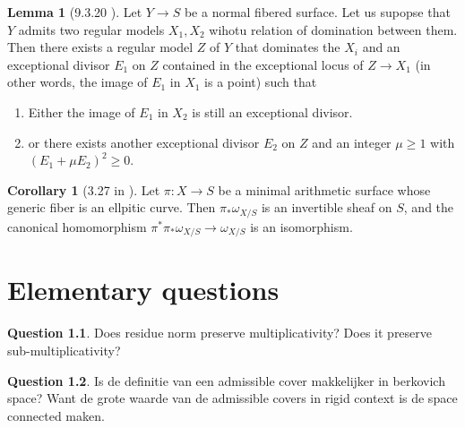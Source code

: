 \documentclass[a4paper]{report}
\theoremstyle{definition}
\newtheorem*{lemma}{Lemma}
\newtheorem*{corollary}{Corollary}
\newtheorem{question}{Question}
\begin{document}
\begin{lemma}
	[9.3.20 \cite{liu}]
	Let $Y \to S $ be a normal fibered surface. Let us supopse that $Y$ admits two regular models $X_1, X_2$ wihotu relation of domination between them. 
	Then there exists a regular model $Z$ of $Y$ that dominates the $X_i$ and an exceptional divisor $E_1$ on $Z$ contained in the exceptional locus of $Z \to X_1$ (in other words, the image of $E_1$ in $X_1$ is a point) such that 
	\begin{enumerate}
		\item Either the image of $E_1$ in $X_2$ is still an exceptional divisor. 
		\item or there exists another exceptional divisor $E_2$ on $Z$ and an integer $\mu \ge 1$ with $(E_1 + \mu E_2)^2 \ge 0$. 
	\end{enumerate}
\end{lemma}


\begin{corollary}
	[3.27 in \cite{liu}]
	Let $\pi: X \to S$ be a minimal arithmetic surface whose generic fiber is an ellpitic curve. 
	Then $\pi_* \omega_{X / S}$ is an invertible sheaf on $S$, and the canonical homomorphism $\pi^* \pi_* \omega_{X / S} \to \omega_{X / S}$ is an isomorphism. 
\end{corollary}

\pagebreak
\printbibliography

\chapter{Elementary questions} \label{chap:elementary_}
\begin{question}
	Does residue norm preserve multiplicativity?
	Does it preserve sub-multiplicativity?
\end{question}
\begin{question}
	Is de definitie van een admissible cover makkelijker in  berkovich space? Want de grote waarde van de admissible covers in rigid context is de space connected maken.
\end{question}
\end{document}
